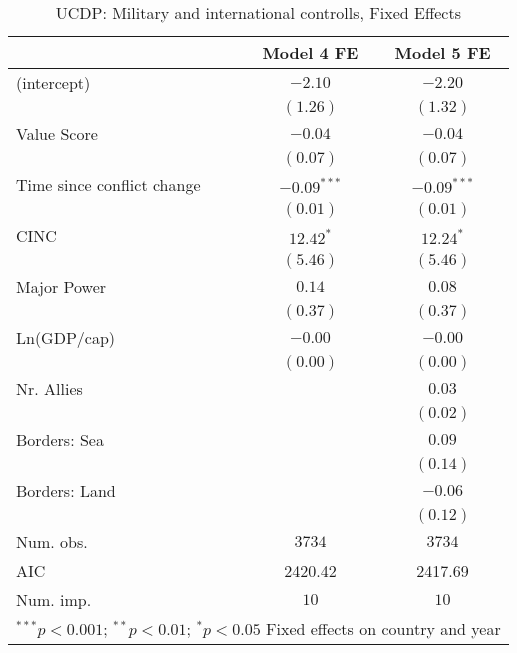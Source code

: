
\begin{table}
\begin{center}
\begin{tabular}{l c c}
\toprule
 & Model 4 FE & Model 5 FE \\
\midrule
(intercept)                & $-2.10$       & $-2.20$       \\
                           & $(1.26)$      & $(1.32)$      \\
Value Score                & $-0.04$       & $-0.04$       \\
                           & $(0.07)$      & $(0.07)$      \\
Time since conflict change & $-0.09^{***}$ & $-0.09^{***}$ \\
                           & $(0.01)$      & $(0.01)$      \\
CINC                       & $12.42^{*}$   & $12.24^{*}$   \\
                           & $(5.46)$      & $(5.46)$      \\
Major Power                & $0.14$        & $0.08$        \\
                           & $(0.37)$      & $(0.37)$      \\
Ln(GDP/cap)                & $-0.00$       & $-0.00$       \\
                           & $(0.00)$      & $(0.00)$      \\
Nr. Allies                 &               & $0.03$        \\
                           &               & $(0.02)$      \\
Borders: Sea               &               & $0.09$        \\
                           &               & $(0.14)$      \\
Borders: Land              &               & $-0.06$       \\
                           &               & $(0.12)$      \\
\midrule
Num. obs.                  & $3734$        & $3734$        \\
AIC                        & 2420.42       & 2417.69       \\
Num. imp.                  & $10$          & $10$          \\
\bottomrule
\multicolumn{3}{l}{\scriptsize{$^{***}p<0.001$; $^{**}p<0.01$; $^{*}p<0.05$ 
 Fixed effects on country and year}}
\end{tabular}
\caption{UCDP: Military and international controlls, Fixed Effects}
\label{UCDP_2_FE}
\end{center}
\end{table}
